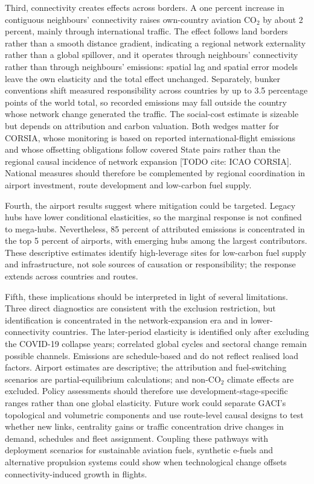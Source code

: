 \documentclass[12pt]{extarticle}
\begin{document}
Third, connectivity creates effects across borders. A one percent increase in contiguous neighbours' connectivity raises own-country aviation CO$_2$ by about 2 percent, mainly through international traffic. The effect follows land borders rather than a smooth distance gradient, indicating a regional network externality rather than a global spillover, and it operates through neighbours' connectivity rather than through neighbours' emissions: spatial lag and spatial error models leave the own elasticity and the total effect unchanged. Separately, bunker conventions shift measured responsibility across countries by up to 3.5 percentage points of the world total, so recorded emissions may fall outside the country whose network change generated the traffic. The social-cost estimate is sizeable but depends on attribution and carbon valuation. Both wedges matter for CORSIA, whose monitoring is based on reported international-flight emissions and whose offsetting obligations follow covered State pairs rather than the regional causal incidence of network expansion [TODO cite: ICAO CORSIA]. National measures should therefore be complemented by regional coordination in airport investment, route development and low-carbon fuel supply.

Fourth, the airport results suggest where mitigation could be targeted. Legacy hubs have lower conditional elasticities, so the marginal response is not confined to mega-hubs. Nevertheless, 85 percent of attributed emissions is concentrated in the top 5 percent of airports, with emerging hubs among the largest contributors. These descriptive estimates identify high-leverage sites for low-carbon fuel supply and infrastructure, not sole sources of causation or responsibility; the response extends across countries and routes.

Fifth, these implications should be interpreted in light of several limitations. Three direct diagnostics are consistent with the exclusion restriction, but identification is concentrated in the network-expansion era and in lower-connectivity countries. The later-period elasticity is identified only after excluding the COVID-19 collapse years; correlated global cycles and sectoral change remain possible channels. Emissions are schedule-based and do not reflect realised load factors. Airport estimates are descriptive; the attribution and fuel-switching scenarios are partial-equilibrium calculations; and non-CO$_2$ climate effects are excluded. Policy assessments should therefore use development-stage-specific ranges rather than one global elasticity. Future work could separate GACI's topological and volumetric components and use route-level causal designs to test whether new links, centrality gains or traffic concentration drive changes in demand, schedules and fleet assignment. Coupling these pathways with deployment scenarios for sustainable aviation fuels, synthetic e-fuels and alternative propulsion systems could show when technological change offsets connectivity-induced growth in flights.
\end{document}
